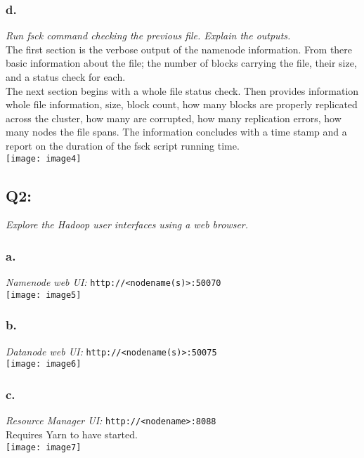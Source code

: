 \documentclass[]{article}
\begin{document}
\subsubsection*{d.}
\emph{Run fsck command checking the previous file. Explain the outputs.}
\vspace{0.25em} \\
The first section is the verbose output of the namenode information. 
From there basic information about the file; 
the number of blocks carrying the file, 
their size, 
and a status check for each.\\
The next section begins with a whole file status check.
Then provides information whole file information, 
size, block count, 
how many blocks are properly replicated across the cluster, 
how many are corrupted, 
how many replication errors, 
how many nodes the file spans. 
The information concludes with a time stamp 
and a report on the duration of the fsck script running time. \\

\texttt{[image: image4]} \vspace{-1.5em}

\subsection*{Q2:}
\emph{Explore the Hadoop user interfaces using a web browser.} \\

\subsubsection*{a.}
\emph{Namenode web UI: }
\texttt{http://<nodename(s)>:50070}
\vspace{1em} \\
\texttt{[image: image5]} \vspace{-1.5em}

\subsubsection*{b.}
\emph{Datanode web UI: }
\texttt{http://<nodename(s)>:50075} 
\vspace{1em} \\
\texttt{[image: image6]} \vspace{-1.5em}

\clearpage

\subsubsection*{c.}
\emph{Resource Manager UI: }
\texttt{http://<nodename>:8088}
\vspace{1em} \\
Requires Yarn to have started. \\
\texttt{[image: image7]} \vspace{-1.5em}
\end{document}
